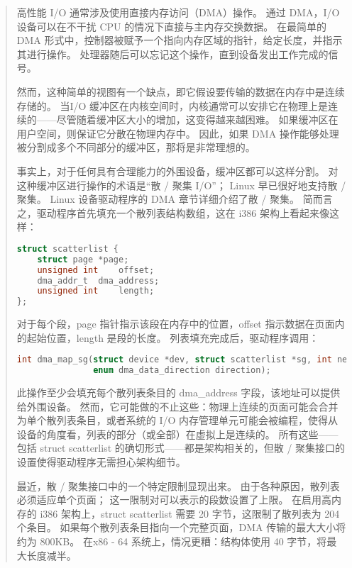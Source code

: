 \begin{quote}

高性能 I/O 通常涉及使用直接内存访问（DMA）操作。
通过 DMA，I/O 设备可以在不干扰 CPU 的情况下直接与主内存交换数据。
在最简单的 DMA 形式中，控制器被赋予一个指向内存区域的指针，给定长度，并指示其进行操作。
处理器随后可以忘记这个操作，直到设备发出工作完成的信号。

然而，这种简单的视图有一个缺点，即它假设要传输的数据在内存中是连续存储的。
当I/O 缓冲区在内核空间时，内核通常可以安排它在物理上是连续的——尽管随着缓冲区大小的增加，这变得越来越困难。
如果缓冲区在用户空间，则保证它分散在物理内存中。
因此，如果 DMA 操作能够处理被分割成多个不同部分的缓冲区，那将是非常理想的。

事实上，对于任何具有合理能力的外围设备，缓冲区都可以这样分割。
对这种缓冲区进行操作的术语是“散 / 聚集 I/O”；
Linux 早已很好地支持散 / 聚集。
Linux 设备驱动程序的 DMA 章节详细介绍了散 / 聚集。
简而言之，驱动程序首先填充一个散列表结构数组，这在 i386 架构上看起来像这样：

\begin{lstlisting}[language=C]
struct scatterlist {
    struct page *page;
    unsigned int    offset;
    dma_addr_t  dma_address;
    unsigned int    length;
};
\end{lstlisting}

对于每个段，page 指针指示该段在内存中的位置，offset 指示数据在页面内的起始位置，length 是段的长度。
列表填充完成后，驱动程序调用：

\begin{lstlisting}[language=C]
int dma_map_sg(struct device *dev, struct scatterlist *sg, int nents,
               enum dma_data_direction direction);
\end{lstlisting}

此操作至少会填充每个散列表条目的 dma\_address 字段，该地址可以提供给外围设备。
然而，它可能做的不止这些：物理上连续的页面可能会合并为单个散列表条目，或者系统的 I/O 内存管理单元可能会被编程，使得从设备的角度看，列表的部分（或全部）在虚拟上是连续的。
所有这些——包括 struct scatterlist 的确切形式——都是架构相关的，但散 / 聚集接口的设置使得驱动程序无需担心架构细节。

最近，散 / 聚集接口中的一个特定限制显现出来。
由于各种原因，散列表必须适应单个页面；
这一限制对可以表示的段数设置了上限。
在启用高内存的 i386 架构上，struct scatterlist 需要 20 字节，这限制了散列表为 204 个条目。
如果每个散列表条目指向一个完整页面，DMA 传输的最大大小将约为 800KB。
在x86 - 64 系统上，情况更糟：结构体使用 40 字节，将最大长度减半。


\end{quote}
